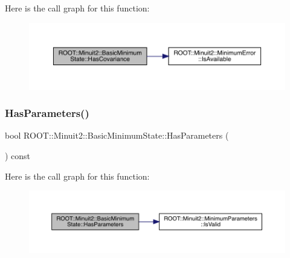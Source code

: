 Here is the call graph for this function\+:
\nopagebreak
\begin{figure}[H]
\begin{center}
\leavevmode
\includegraphics[width=350pt]{d0/db1/classROOT_1_1Minuit2_1_1BasicMinimumState_a9d43155058c576759d062561d77b3e1d_cgraph}
\end{center}
\end{figure}
\mbox{\label{classROOT_1_1Minuit2_1_1BasicMinimumState_a1af83c0464c727dc173834c1612f5e49}} 
\subsubsection{\texorpdfstring{HasParameters()}{HasParameters()}\hspace{0.1cm}{\footnotesize\ttfamily [1/2]}}
{\footnotesize\ttfamily bool R\+O\+O\+T\+::\+Minuit2\+::\+Basic\+Minimum\+State\+::\+Has\+Parameters (\begin{DoxyParamCaption}{ }\end{DoxyParamCaption}) const\hspace{0.3cm}{\ttfamily [inline]}}

Here is the call graph for this function\+:
\nopagebreak
\begin{figure}[H]
\begin{center}
\leavevmode
\includegraphics[width=350pt]{d0/db1/classROOT_1_1Minuit2_1_1BasicMinimumState_a1af83c0464c727dc173834c1612f5e49_cgraph}
\end{center}
\end{figure}
\mbox{\label{classROOT_1_1Minuit2_1_1BasicMinimumState_a1af83c0464c727dc173834c1612f5e49}} 
